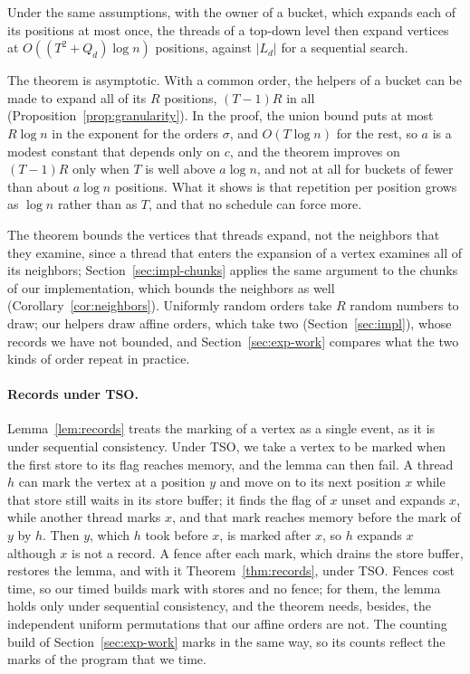 Under the same assumptions, with the owner of a bucket, which expands each of its positions at most once, the threads of a top-down level then expand vertices at $O((T^2 + Q_d)\log n)$ positions, against $|L_d|$ for a sequential search.

The theorem is asymptotic. With a common order, the helpers of a bucket can be made to expand all of its $R$ positions, $(T-1)R$ in all (Proposition~\ref{prop:granularity}). In the proof, the union bound puts at most $R \log n$ in the exponent for the orders $\sigma$, and $O(T \log n)$ for the rest, so $a$ is a modest constant that depends only on $c$, and the theorem improves on $(T-1)R$ only when $T$ is well above $a \log n$, and not at all for buckets of fewer than about $a \log n$ positions. What it shows is that repetition per position grows as $\log n$ rather than as $T$, and that no schedule can force more.

The theorem bounds the vertices that threads expand, not the neighbors that they examine, since a thread that enters the expansion of a vertex examines all of its neighbors; Section~\ref{sec:impl-chunks} applies the same argument to the chunks of our implementation, which bounds the neighbors as well (Corollary~\ref{cor:neighbors}). Uniformly random orders take $R$ random numbers to draw; our helpers draw affine orders, which take two (Section~\ref{sec:impl}), whose records we have not bounded, and Section~\ref{sec:exp-work} compares what the two kinds of order repeat in practice.

\paragraph{Records under TSO\@.} Lemma~\ref{lem:records} treats the marking of a vertex as a single event, as it is under sequential consistency. Under TSO, we take a vertex to be marked when the first store to its flag reaches memory, and the lemma can then fail. A thread $h$ can mark the vertex at a position $y$ and move on to its next position $x$ while that store still waits in its store buffer; it finds the flag of $x$ unset and expands $x$, while another thread marks $x$, and that mark reaches memory before the mark of $y$ by $h$. Then $y$, which $h$ took before $x$, is marked after $x$, so $h$ expands $x$ although $x$ is not a record. A fence after each mark, which drains the store buffer, restores the lemma, and with it Theorem~\ref{thm:records}, under TSO. Fences cost time, so our timed builds mark with stores and no fence; for them, the lemma holds only under sequential consistency, and the theorem needs, besides, the independent uniform permutations that our affine orders are not. The counting build of Section~\ref{sec:exp-work} marks in the same way, so its counts reflect the marks of the program that we time.

